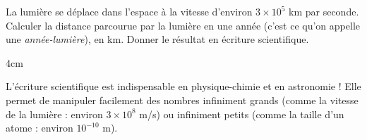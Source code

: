 \documentclass[a4paper]{book}
\begin{document}
    
    \begin{exemple}
        La lumière se déplace dans l'espace à la vitesse d'environ $3 \times 10^5$ km par seconde. \\
        Calculer la distance parcourue par la lumière en une année (c'est ce qu'on appelle une \textit{année-lumière}), en km. Donner le résultat en écriture scientifique.

        \begin{ZoneReponse}{4cm}
        \end{ZoneReponse}
    \end{exemple}
    
        
    \begin{cultureMaths}
        L'écriture scientifique est indispensable en physique-chimie et en astronomie ! Elle permet de manipuler facilement des nombres infiniment grands (comme la vitesse de la lumière : environ $3 \times 10^8$ m/s) ou infiniment petits (comme la taille d'un atome : environ $10^{-10}$ m).
    \end{cultureMaths}
\end{document}
